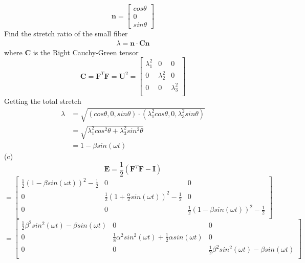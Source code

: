 \documentclass{elsarticle}
\begin{document}
\begin{equation*}
    \bm{n}=\begin{bmatrix}
        cos\theta\\
        0\\
        sin\theta
    \end{bmatrix}
\end{equation*}
Find the stretch ratio of the small fiber
\begin{align*}
    \lambda=\bm{n}\cdot\mathbf{C}\bm{n}
\end{align*}
where $\mathbf{C}$ is the Right Cauchy-Green tensor
\begin{equation*}
\mathbf{C}=\mathbf{F}^{T}\mathbf{F}=\mathbf{U}^2=
    \begin{bmatrix}
    \lambda_1^2&0&0\\
    0&\lambda_2^2&0\\
    0&0&\lambda_3^2\\
    \end{bmatrix}
\end{equation*}
Getting the total stretch
\begin{align*}
    \lambda&=\sqrt{(cos\theta,0,sin\theta)\cdot(\lambda_1^2cos\theta,0,\lambda_3^2sin\theta)}\\
    &=\sqrt{\lambda_1^2cos^2\theta+\lambda^2_3sin^2\theta}\\
    &=1-\beta sin(\omega t)
\end{align*}
(c)
\begin{equation*}
\mathbf{E}=\frac{1}{2}(\mathbf{F}^T\mathbf{F}-\mathbf{I})
\end{equation*}
\begin{equation*}
    =\begin{bmatrix}
        \frac{1}{2}(1-\beta sin(\omega t))^2-\frac{1}{2}&0&0\\
        0&\frac{1}{2}(1+\frac{\alpha}{2} sin(\omega t))^2-\frac{1}{2}&0\\
        0&0&\frac{1}{2}(1-\beta sin(\omega t))^2-\frac{1}{2}\\
    \end{bmatrix}
\end{equation*}
\begin{equation*}
    =\begin{bmatrix}
        \frac{1}{2}\beta^2sin^2(\omega t)-\beta sin(\omega t)&0&0\\
        0&\frac{1}{8}\alpha^2sin^2(\omega t)+\frac{1}{2}\alpha sin(\omega t)&0\\
        0&0&\frac{1}{2}\beta^2sin^2(\omega t)-\beta sin(\omega t)\\
    \end{bmatrix}
\end{equation*}
\end{document}
